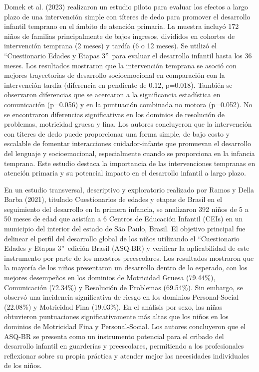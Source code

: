 \documentclass[11pt,letterpaper]{report}
\newcommand{\asq}{“Cuestionario Edades y Etapas 3”}
\begin{document}
Domek et al. (2023) realizaron un estudio piloto para evaluar los efectos a
largo plazo de una intervención simple con títeres de dedo para promover el
desarrollo infantil temprano en el ámbito de atención primaria. La muestra
incluyó 172 niños de familias principalmente de bajos ingresos, divididos en
cohortes de intervención temprana (2 meses) y tardía (6 o 12 meses). Se utilizó
el \asq\ para evaluar el desarrollo infantil hasta los 36 meses. Los resultados
mostraron que la intervención temprana se asoció con mejores trayectorias de
desarrollo socioemocional en comparación con
la intervención tardía (diferencia en pendiente de 0.12, p=0.018). También se
observaron diferencias que se acercaron a la significancia estadística en
comunicación (p=0.056) y en la puntuación combinada no motora (p=0.052). No se
encontraron diferencias significativas en los dominios de resolución de
problemas, motricidad gruesa y fina. Los autores concluyeron que la
intervención con títeres de dedo puede proporcionar una forma simple, de bajo
costo y escalable de fomentar interacciones cuidador-infante que promuevan el
desarrollo del lenguaje y socioemocional, especialmente cuando se proporciona
en la infancia temprana. Este estudio destaca la importancia de las
intervenciones tempranas en atención primaria y su potencial impacto en el
desarrollo infantil a largo plazo. \cite{Domek2023}

En un estudio transversal, descriptivo y exploratorio realizado por Ramos y
Della Barba (2021), titulado Cuestionarios de edades y etapas de Brasil en el
seguimiento del desarrollo en la primera infancia, se analizaron 392 niños de 
5 a 50 meses de edad que asistían a 6 Centros de Educación Infantil (CEIs) en
un municipio del interior del estado de São Paulo, Brasil. El objetivo
principal fue delinear el perfil del desarrollo global de los niños utilizando 
el \asq\ edición Brasil (ASQ-BR) y verificar la aplicabilidad
de este instrumento por parte de los maestros preescolares. Los resultados
mostraron que la mayoría de los niños presentaron un desarrollo dentro de lo 
esperado, con los mejores desempeños en los dominios de Motricidad Gruesa
(79.44\%), Comunicación (72.34\%) y Resolución de Problemas (69.54\%). Sin
embargo, se observó una incidencia significativa de riesgo en los dominios
Personal-Social (22.08\%) y Motricidad Fina (19.03\%). En el análisis por sexo,
las niñas obtuvieron puntuaciones significativamente más altas que los niños en
los dominios de Motricidad Fina y Personal-Social. Los autores concluyeron que
el ASQ-BR se presenta como un instrumento potencial para el cribado del
desarrollo infantil en guarderías y preescolares, permitiendo a los
profesionales reflexionar sobre su propia práctica y atender mejor las
necesidades individuales de los niños. \cite{RAMOS2021}
\end{document}
